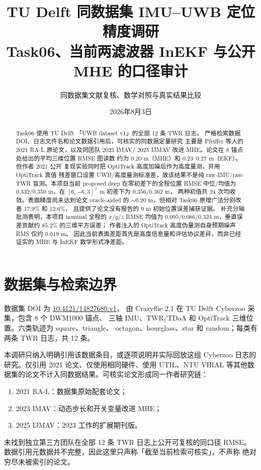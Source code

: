 \documentclass[11pt,a4paper]{ctexart}
\title{TU Delft 同数据集 IMU--UWB 定位精度调研\\
Task06、当前两滤波器 InEKF 与公开 MHE 的口径审计}
\author{同数据集文献复核、数学对照与真实结果比较}
\date{2026年8月3日}
\begin{document}
\pagestyle{plain}
\maketitle

\begin{abstract}
Task06 使用 TU Delft 「UWB dataset v1」的全部 12 条 TWR 日志。
严格检索数据 DOI、日志文件名和论文数据引用后，可核实的同数据定量研究
主要是 Pfeiffer 等人的 2021 RA-L 原论文，以及同团队 2023 IMAV/
2025 IJMAV 改进 MHE。论文在 8 锚点处给出的平均三维位置 RMSE 图读数
约为 $0.20$ m（MHE）和 $0.23$--$0.27$ m（EKF）。但作者 2021 公开
复现实验同时把 OptiTrack 高度加噪后作为高度量测，并用 OptiTrack 真值
残差窗口设置 UWB/高度量测标准差，故该结果不是纯 raw-IMU/raw-TWR
盲测。本项目当前 proposed deep 在零初差下的全程位置 RMSE 中位/均值为
$0.332/0.350$ m，在 $[6,-6,3]^\top$ m 初差下为 $0.356/0.362$ m，
两种初值共 24 次均收敛。表面精度尚未达到论文 oracle-aided 的
$\sim0.20$ m，但相对 Task06 原增广法分别改善 $17.9\%$ 和 $12.6\%$，
且提供了论文没有报告的 9 m 初始位置误差捕获证据。
补充分轴批测表明，本项目 nominal 全程的 $x/y/z$ RMSE 均值为
$0.095/0.086/0.324$ m，垂直误差贡献约 $85.2\%$ 的三维平方误差；
作者注入的 OptiTrack 高度伪量测自身预期噪声 RMS 仅约 $0.019$ m。
因此当前表面差距首先是高度信息量和评估协议差异，而非已经证实的
MHE 与 InEKF 数学形式净差距。
\end{abstract}

\section{数据集与检索边界}

数据集 DOI 为
\href{https://doi.org/10.4121/14827680.v1}{10.4121/14827680.v1}，
由 Crazyflie 2.1 在 TU Delft Cyberzoo 采集，包含 8 个 DWM1000 锚点、
三轴 IMU、TWR/TDoA 和 OptiTrack 三维位置。六类轨迹为 square、triangle、
octagon、hourglass、star 和 random；每类有两条 TWR 日志，共 12 条。

本调研只纳入明确引用该数据条目，或逐项说明并实际回放这组 Cyberzoo
日志的研究。仅引用 2021 论文、仅使用相同硬件、使用 UTIL、NTU VIRAL
等其他数据集的论文不计入同数据结果。可核实论文形成同一作者研究链：
\begin{enumerate}
 \item 2021 RA-L：数据集原始配套论文\cite{pfeiffer2021}；
 \item 2023 IMAV：动态步长和开关变量改进 MHE\cite{pfeiffer2023}；
 \item 2025 IJMAV：2023 工作的扩展期刊版\cite{pfeiffer2025}。
\end{enumerate}
未找到独立第三方团队在全部 12 条 TWR 日志上公开可复核的同口径 RMSE。
数据引用元数据并不完整，因此这里只声称「截至当前检索可核实」，不声称
绝对穷尽未被索引的论文。
\end{document}

